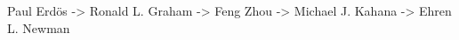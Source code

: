 \begin{cvpubentries}

%
\iftrue
  \cvpubentry
    { } %
    { } %
    { } %
    { } %
    {
      \begin{cvpubitems} %
	\item{Paul Erd\"{o}s -> Ronald L. Graham -> Feng Zhou -> Michael J. Kahana -> Ehren L. Newman}
       \end{cvpubitems} 
    }
\fi


\end{cvpubentries}

